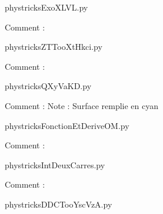    \newcommand{\CaptionFigExoXLVL}{<+Type your caption here+>}
    \begin{center}
        
    \end{center}
    phystricksExoXLVL.py

    Comment : 

    \clearpage
    


    \newcommand{\CaptionFigZTTooXtHkci}{<+Type your caption here+>}
    \begin{center}
        
    \end{center}
    phystricksZTTooXtHkci.py

    Comment : 

    \clearpage
    


    \newcommand{\CaptionFigQXyVaKD}{<+Type your caption here+>}
    \begin{center}
        
    \end{center}
    phystricksQXyVaKD.py

    Comment : Note : Surface remplie en cyan

    \clearpage
    


    \newcommand{\CaptionFigFonctionEtDeriveOM}{<+Type your caption here+>}
    \begin{center}
        
    \end{center}
    phystricksFonctionEtDeriveOM.py

    Comment : 

    \clearpage
    


    \newcommand{\CaptionFigIntDeuxCarres}{<+Type your caption here+>}
    \begin{center}
        
    \end{center}
    phystricksIntDeuxCarres.py

    Comment : 

    \clearpage
    


    \newcommand{\CaptionFigDDCTooYscVzA}{<+Type your caption here+>}
    \begin{center}
        
    \end{center}
    phystricksDDCTooYscVzA.py

